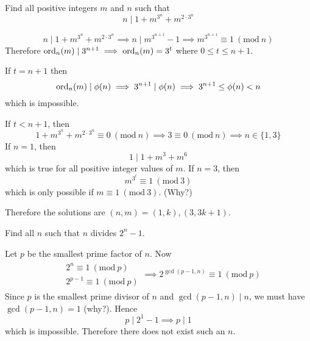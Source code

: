 \documentclass[11pt,numbers=noenddot,svgnames,dvipsnames]{scrartcl}
\renewcommand{\pmod}[1]{\ (\mathrm{mod}\ #1)}
\begin{document}
\begin{example}
    Find all positive integers $m$ and $n$ such that 
    \[
        n \mid 1 + m^{3^{n}} + m^{2\cdot 3^{n}}
    \]
\end{example}
\begin{sol}
    \[
        n \mid 1 + m^{3^{n}} + m^{2\cdot 3^{n}}
        \implies n \mid m^{3^{n+1}} - 1
        \implies m^{3^{n+1}} \equiv 1 \pmod n
    \]
    Therefore $\operatorname{ord}_{n}(m) \mid 3^{n+1} \implies \operatorname{ord}_{n}(m) = 3^{t}$ 
    where $0\leq t \leq n+1$. 

    If $t = n+1$ then 
    \[
        \operatorname{ord}_{n}(m) \mid \phi(n) 
        \implies 3^{n+1} \mid \phi(n) 
        \implies 3^{n+1} \leq \phi(n) < n
    \]
    which is impossible. 

    If $t < n+1$, then 
    \[
        1 + m^{3^{n}} + m^{2\cdot 3^{n}} \equiv 0 \pmod n
        \implies 3 \equiv 0 \pmod n 
        \implies n \in \{1, 3\}
    \]
    If $n=1$, then
    \[
        1 \mid 1 + m^{3} + m^{6}
    \]
    which is true for all positive integer values of $m$. 
    If $n=3$, then 
    \[ m^{3^{t}} \equiv 1 \pmod 3\]
    which is only possible if $m \equiv 1 \pmod 3$. (Why?)

    Therefore the solutions are $(n, m) = (1, k), (3, 3k+1)$.
\end{sol}

\begin{example}
    Find all $n$ such that $n$ divides $2^{n} - 1$.
\end{example}
\begin{sol}
    Let $p$ be the smallest prime factor of $n$. Now 
    \begin{align*}
        \begin{matrix}
            & 2^n     \equiv 1 \pmod p \\
            & 2^{p-1} \equiv 1 \pmod p
        \end{matrix} \implies 2^{\gcd(p - 1, n)} \equiv 1 \pmod p
    \end{align*}
    Since $p$ is the smallest prime divisor of $n$ and $\gcd(p - 1, n) \mid n$, 
    we must have $\gcd(p - 1, n) = 1$ (why?). Hence 
    \[
        p \mid 2^1 - 1 \implies p \mid 1
    \]
    which is impossible. Therefore there does not exist such an $n$.
\end{sol}
\end{document}
